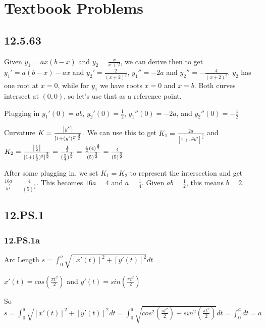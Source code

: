 \documentclass{article}
\begin{document}
\section{Textbook Problems}

\subsection{12.5.63}

\par\noindent\Large Given $y_{1} = ax(b - x)$ and $y_{2} = \frac{x}{x + 2}$, we can derive then to get $y_{1}' = a(b - x) - ax$ and $y_{2}' = \frac{2}{(x + 2)^{2}}$, $y_{1}'' = -2a$ and $y_{2}'' = -\frac{4}{(x + 2)^{3}}$. $y_{2}$ has one root at $x = 0$, while for $y_{1}$ we have roots $x = 0$ and $x = b$.  Both curves intersect at $(0, 0)$, so let's use that as a reference point.\vspace{0.25cm}

\par\noindent\Large Plugging in $y_{1}'(0) = ab$, $y_{2}'(0) = \frac{1}{2}$, $y_{1}''(0) = -2a$, and $y_{2}''(0) = -\frac{1}{2}$\vspace{0.25cm}

\par\noindent\Large Curvature $K = \frac{\abs{y''}}{[1 + (y')^{2}]^{\frac{3}{2}}}$.  We can use this to get $K_{1} = \frac{2a}{[1 + a^{2}b^{2}]^{\frac{3}{2}}}$ and $K_{2} = \frac{\abs{\frac{1}{2}}}{[1 + (\frac{1}{2})^{2}]^{\frac{3}{2}}} = \frac{\frac{1}{2}}{(\frac{5}{4})^{\frac{3}{2}}} = \frac{\frac{1}{2}(4)^{\frac{3}{2}}}{(5)^{\frac{3}{2}}} = \frac{4}{(5)^{\frac{3}{2}}}$\vspace{0.25cm}

\par\noindent\Large After some plugging in, we set $K_{1} = K_{2}$ to represent the intersection and get $\frac{16a}{{5}^{\frac{3}{2}}} = \frac{4}{(5)^{\frac{3}{2}}}$.  This becomes $16a = 4$ and $a = \frac{1}{4}$.  Given $ab = \frac{1}{2}$, this means $b = 2$.

\subsection{12.PS.1}

\subsubsection{12.PS.1a}

\par\noindent\Large Arc Length $s = \int_{0}^{a}\sqrt{[x'(t)]^{2} + [y'(t)]^{2}}dt$
\par\noindent\Large $x'(t) = cos(\frac{\pi t^{2}}{2})$ and $y'(t) = sin(\frac{\pi t^{2}}{2})$
\par\noindent\Large So $s = \int_{0}^{a}\sqrt{[x'(t)]^{2} + [y'(t)]^{2}}dt = \int_{0}^{a}\sqrt{cos^{2}(\frac{\pi t^{2}}{2}) + sin^{2}(\frac{\pi t^{2}}{2})}dt = \int_{0}^{a}dt = a$
\end{document}

